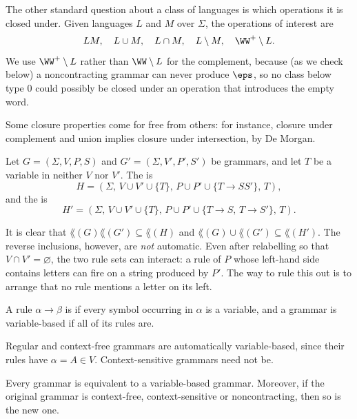 The other standard question about a class of languages is which operations it is closed under. Given languages $L$ and $M$ over $\Sigma$, the operations of interest are
$$LM, \quad L \cup M, \quad L \cap M, \quad L \setminus M, \quad \WW^+ \setminus L.$$
We use $\WW^+ \setminus L$ rather than $\WW \setminus L$ for the complement, because (as we check below) a noncontracting grammar can never produce $\eps$, so no class below type 0 could possibly be closed under an operation that introduces the empty word.

Some closure properties come for free from others: for instance, closure under complement and union implies closure under intersection, by De Morgan.

\begin{definition}
	Let $G = (\Sigma, V, P, S)$ and $G' = (\Sigma, V', P', S')$ be grammars, and let $T$ be a variable in neither $V$ nor $V'$. The  is
	$$H = (\Sigma,\, V \cup V' \cup \{T\},\, P \cup P' \cup \{T \to SS'\},\, T),$$
	and the  is
	$$H' = (\Sigma,\, V \cup V' \cup \{T\},\, P \cup P' \cup \{T \to S,\, T \to S'\},\, T).$$
\end{definition}

It is clear that $\lang(G)\lang(G') \subseteq \lang(H)$ and $\lang(G) \cup \lang(G') \subseteq \lang(H')$. The reverse inclusions, however, are \emph{not} automatic. Even after relabelling so that $V \cap V' = \varnothing$, the two rule sets can interact: a rule of $P$ whose left-hand side contains letters can fire on a string produced by $P'$. The way to rule this out is to arrange that no rule mentions a letter on its left.

\begin{definition}
	A rule $\alpha \to \beta$ is  if every symbol occurring in $\alpha$ is a variable, and a grammar is variable-based if all of its rules are.
\end{definition}

Regular and context-free grammars are automatically variable-based, since their rules have $\alpha = A \in V$. Context-sensitive grammars need not be.

\begin{lemma}\label{lem:variablebased}
	Every grammar is equivalent to a variable-based grammar. Moreover, if the original grammar is context-free, context-sensitive or noncontracting, then so is the new one.
\end{lemma}

